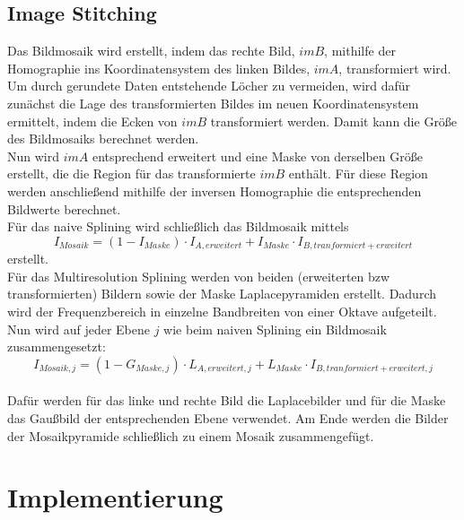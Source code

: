\documentclass[deutsch]{scrartcl}
\begin{document}
\subsection{Image Stitching}
Das Bildmosaik wird erstellt, indem das rechte Bild, $imB$, mithilfe der Homographie ins Koordinatensystem des linken Bildes, $imA$, transformiert wird. Um durch gerundete Daten entstehende Löcher zu vermeiden, wird dafür zunächst die Lage des transformierten Bildes im neuen Koordinatensystem ermittelt, indem die Ecken von $imB$ transformiert werden. Damit kann die Größe des Bildmosaiks berechnet werden.\\
Nun wird $imA$ entsprechend erweitert und eine Maske von derselben Größe erstellt, die die Region für das transformierte $imB$ enthält. Für diese Region werden anschließend mithilfe der inversen Homographie die entsprechenden Bildwerte berechnet. \\
Für das naive Splining wird schließlich das Bildmosaik mittels 
\begin{equation}\label{naive}
	I_{Mosaik}=(1-I_{Maske})\cdot I_{A,erweitert} + I_{Maske}\cdot I_{B,tranformiert+erweitert}
\end{equation} erstellt. \\
Für das Multiresolution Splining\cite{spline83} werden von beiden (erweiterten bzw transformierten) Bildern sowie der Maske Laplacepyramiden erstellt. Dadurch wird der Frequenzbereich in einzelne Bandbreiten von einer Oktave aufgeteilt. Nun wird auf jeder Ebene $j$ wie beim naiven Splining ein Bildmosaik zusammengesetzt:
\begin{equation}\label{mrs}
	I_{Mosaik,j}=(1-G_{Maske,j})\cdot L_{A,erweitert,j} + L_{Maske}\cdot I_{B,tranformiert+erweitert,j}
\end{equation} \\ 
Dafür werden für das linke und rechte Bild die Laplacebilder und für die Maske das Gaußbild der entsprechenden Ebene verwendet. Am Ende werden die Bilder der Mosaikpyramide schließlich zu einem Mosaik zusammengefügt.


\newpage
\section{Implementierung}
\end{document}
